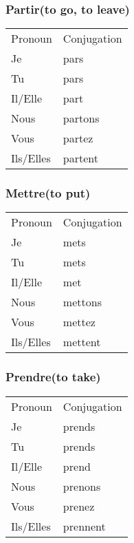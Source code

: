 \subsubsection{Partir(to go, to leave)}
\begin{tabular}{| l | l |}
\hline
Pronoun 	& Conjugation	\\
Je		    &  pars \\
Tu		    &  pars \\
Il/Elle		&  part \\
Nous		&  partons   \\
Vous		&  partez \\
Ils/Elles	&  partent \\
\hline
\end{tabular}

\subsubsection{Mettre(to put)}
\begin{tabular}{| l | l |}
\hline
Pronoun 	& Conjugation	\\
Je		    &  mets \\
Tu		    &  mets \\
Il/Elle		&  met \\
Nous		&  mettons   \\
Vous		&  mettez \\
Ils/Elles	&  mettent \\
\hline
\end{tabular}

\subsubsection{Prendre(to take)}
\begin{tabular}{| l | l |}
\hline
Pronoun 	& Conjugation	\\
Je		    &  prends \\
Tu		    &  prends \\
Il/Elle		&  prend \\
Nous		&  prenons   \\
Vous		&  prenez \\
Ils/Elles	&  prennent \\
\hline
\end{tabular}
